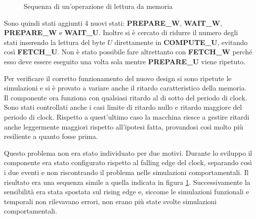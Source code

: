 \begin{figure}[!ht]
    \centering
    \caption{Sequenza di un'operazione di lettura da memoria}
    \label{fig:letturamemoria}
\end{figure}

Sono quindi stati aggiunti 4 nuovi stati: \textbf{PREPARE\_W}, \textbf{WAIT\_W}, \textbf{PREPARE\_W} e \textbf{WAIT\_U}. Inoltre si è cercato di ridurre il numero degli stati inserendo la lettura del byte $U$ direttamente in \textbf{COMPUTE\_U}, evitando così \textbf{FETCH\_U}. Non è stato possibile fare altrettanto con \textbf{FETCH\_W} perché esso deve essere eseguito una volta sola mentre \textbf{PREPARE\_U} viene ripetuto.

Per verificare il corretto funzionamento del nuovo design si sono ripetute le simulazioni e si è provato a variare anche il ritardo caratteristico della memoria. Il componente ora funziona con qualsiasi ritardo al di sotto del periodo di clock. Sono stati controllati anche i casi limite di ritardo nullo e ritardo maggiore del periodo di clock. Rispetto a quest'ultimo caso la macchina riesce a gestire ritardi anche leggermente maggiori rispetto all'ipotesi fatta, provandosi così molto più resiliente a quanto fosse prima.

Questo problema non era stato individuato per due motivi. Durante lo sviluppo il componente era stato configurato rispetto al falling edge del clock, separando così i due eventi e non riscontrando il problema nelle simulazioni comportamentali. Il risultato era una sequenza simile a quella indicata in figura \ref{fig:letturamemoria}. Successivamente la sensibilità era stata spostata sul rising edge e, siccome le simulazioni funzionali e temporali non rilevavano errori, non erano più state svolte simulazioni comportamentali.